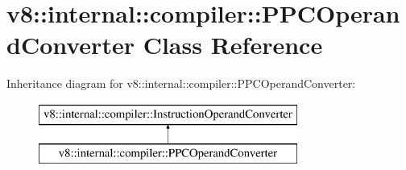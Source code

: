 \hypertarget{classv8_1_1internal_1_1compiler_1_1_p_p_c_operand_converter}{}\section{v8\+:\+:internal\+:\+:compiler\+:\+:P\+P\+C\+Operand\+Converter Class Reference}
\label{classv8_1_1internal_1_1compiler_1_1_p_p_c_operand_converter}
Inheritance diagram for v8\+:\+:internal\+:\+:compiler\+:\+:P\+P\+C\+Operand\+Converter\+:\begin{figure}[H]
\begin{center}
\leavevmode
\includegraphics[height=2.000000cm]{classv8_1_1internal_1_1compiler_1_1_p_p_c_operand_converter}
\end{center}
\end{figure}
